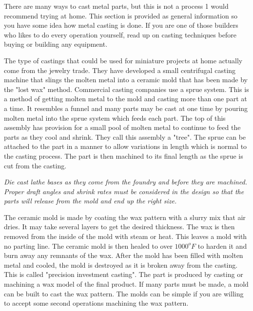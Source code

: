 \secup

\secdown

There are many ways to cast metal parts, but this is not a process 1 would
recommend trying at home. This section is provided as general information so you
have some idea how metal casting is done. If you are one of those builders who
likes to do every operation yourself, read up on casting techniques before
buying or building any equipment.


The type of castings that could be used for miniature projects at home actually
come from the jewelry trade. They have developed a small centrifugal casting
machine that slings the molten metal into a ceramic mold that has been made by
the "lost wax" method. Commercial casting companies use a sprue system. This is
a method of getting molten metal to the mold and casting more than one part at a
time. It resembles a funnel and many parts may be cast at one time by pouring
molten metal into the sprue system which feeds each part. The top of this
assembly has provision for a small pool of molten metal to continue to feed the
parts as they cool and shrink. They call this assembly a "tree". The sprue can
be attached to the part in a manner to allow variations in length which is
normal to the casting process. The part is then machined to its final length as
the sprue is cut from the casting.

\bigskip
\textit{Die cast lathe bases as they come from the foundry and before they are
machined. Proper draft angles and shrink rates must be considered in the design
so that the parts will release from the mold and end up the right size.}
\bigskip


The ceramic mold is made by coating the wax pattern with a slurry mix that air
dries. It may take several layers to get the desired thickness. The wax is then
removed from the inside of the mold with steam or heat. This leaves a mold with
no parting line. The ceramic mold is then healed to over $1000^{o}F$ to harden
it and burn away any remnants of the wax. After the mold has been filled with
molten metal and cooled, the mold is destroyed as it is broken away from the
casting. This is called "precision investment casting". The part is produced by
casting or machining a wax model of the final product. If many parts must be
made, a mold can be built to cast the wax pattern. The molds can be simple if
you are willing to accept some second operations machining the wax pattern.

